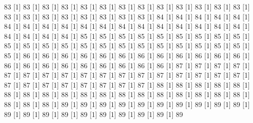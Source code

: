 \documentclass[12pt]{article}
\begin{document}
\begin{Schunk}
\begin{Soutput}
[1] 83%
[1] 83%
[1] 83%
[1] 83%
[1] 83%
[1] 83%
[1] 83%
[1] 83%
[1] 83%
[1] 83%
[1] 83%
[1] 83%
[1] 83%
[1] 83%
[1] 83%
[1] 83%
[1] 83%
[1] 83%
[1] 83%
[1] 83%
[1] 83%
[1] 84%
[1] 84%
[1] 84%
[1] 84%
[1] 84%
[1] 84%
[1] 84%
[1] 84%
[1] 84%
[1] 84%
[1] 84%
[1] 84%
[1] 84%
[1] 84%
[1] 84%
[1] 84%
[1] 84%
[1] 84%
[1] 84%
[1] 84%
[1] 84%
[1] 84%
[1] 85%
[1] 85%
[1] 85%
[1] 85%
[1] 85%
[1] 85%
[1] 85%
[1] 85%
[1] 85%
[1] 85%
[1] 85%
[1] 85%
[1] 85%
[1] 85%
[1] 85%
[1] 85%
[1] 85%
[1] 85%
[1] 85%
[1] 85%
[1] 85%
[1] 85%
[1] 85%
[1] 86%
[1] 86%
[1] 86%
[1] 86%
[1] 86%
[1] 86%
[1] 86%
[1] 86%
[1] 86%
[1] 86%
[1] 86%
[1] 86%
[1] 86%
[1] 86%
[1] 86%
[1] 86%
[1] 86%
[1] 86%
[1] 86%
[1] 86%
[1] 86%
[1] 87%
[1] 87%
[1] 87%
[1] 87%
[1] 87%
[1] 87%
[1] 87%
[1] 87%
[1] 87%
[1] 87%
[1] 87%
[1] 87%
[1] 87%
[1] 87%
[1] 87%
[1] 87%
[1] 87%
[1] 87%
[1] 87%
[1] 87%
[1] 87%
[1] 87%
[1] 87%
[1] 87%
[1] 87%
[1] 88%
[1] 88%
[1] 88%
[1] 88%
[1] 88%
[1] 88%
[1] 88%
[1] 88%
[1] 88%
[1] 88%
[1] 88%
[1] 88%
[1] 88%
[1] 88%
[1] 88%
[1] 88%
[1] 88%
[1] 88%
[1] 88%
[1] 88%
[1] 88%
[1] 89%
[1] 89%
[1] 89%
[1] 89%
[1] 89%
[1] 89%
[1] 89%
[1] 89%
[1] 89%
[1] 89%
[1] 89%
[1] 89%
[1] 89%
[1] 89%
[1] 89%
[1] 89%
[1] 89%
[1] 89%
[1] 89%
[1] 89%

\end{Soutput}
\end{Schunk}
\end{document}
